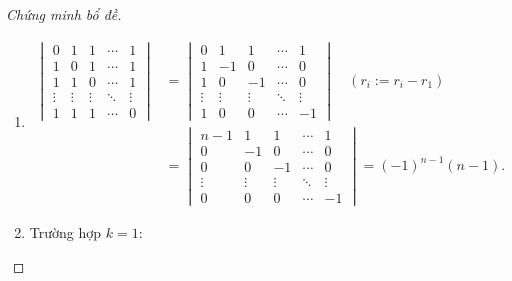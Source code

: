 \documentclass[class=linearalgebra,crop=false]{standalone}
\begin{document}
\begin{proof}[Chứng minh bổ đề]
    \begin{enumerate}[label = (\roman*)]
        \item
              \begingroup
              \allowdisplaybreaks
              \begin{align*}
                  \begin{vmatrix}
                      0      & 1      & 1      & \cdots & 1      \\
                      1      & 0      & 1      & \cdots & 1      \\
                      1      & 1      & 0      & \cdots & 1      \\
                      \vdots & \vdots & \vdots & \ddots & \vdots \\
                      1      & 1      & 1      & \cdots & 0
                  \end{vmatrix}
                   & =
                  \begin{vmatrix}
                      0      & 1      & 1      & \cdots & 1      \\
                      1      & -1     & 0      & \cdots & 0      \\
                      1      & 0      & -1     & \cdots & 0      \\
                      \vdots & \vdots & \vdots & \ddots & \vdots \\
                      1      & 0      & 0      & \cdots & -1
                  \end{vmatrix}\quad(r_{i} := r_{i} - r_{1}) \\
                   & =
                  \begin{vmatrix}
                      n-1    & 1      & 1      & \cdots & 1      \\
                      0      & -1     & 0      & \cdots & 0      \\
                      0      & 0      & -1     & \cdots & 0      \\
                      \vdots & \vdots & \vdots & \ddots & \vdots \\
                      0      & 0      & 0      & \cdots & -1
                  \end{vmatrix}
                  = (-1)^{n-1}(n-1).
              \end{align*}
              \endgroup
        \item
              \par Trường hợp $k = 1$:

\end{enumerate}
\end{proof}
\end{document}
